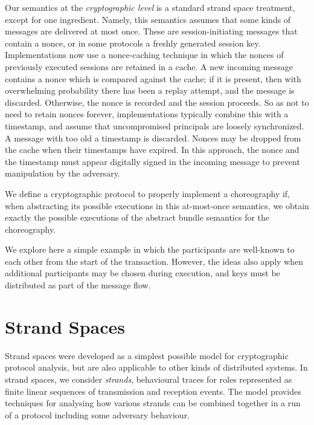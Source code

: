 \documentclass[copyright]{eptcs}
\begin{document}
Our semantics at the \emph{cryptographic level} is a standard strand
space treatment, except for one ingredient.  Namely, this semantics
assumes that some kinds of messages are delivered at most once.  These
are session-initiating messages that contain a nonce, or in some
protocols a freshly generated session key.  Implementations now use a
nonce-caching technique in which the nonces of previously executed
sessions are retained in a cache.  A new incoming message contains a
nonce which is compared against the cache; if it is present, then with
overwhelming probability there has been a replay attempt, and the
message is discarded.  Otherwise, the nonce is recorded and the
session proceeds.  So as not to need to retain nonces forever,
implementations typically combine this with a timestamp, and assume
that uncompromised principals are loosely synchronized.  A message
with too old a timestamp is discarded.  Nonces may be dropped from the
cache when their timestamps have expired.  In this approach, the nonce
and the timestamp must appear digitally signed in the incoming message
to prevent manipulation by the adversary.

We define a cryptographic protocol to properly implement a
choreography if, when abstracting its possible executions in this
at-most-once semantics, we obtain exactly the possible executions of
the abstract bundle semantics for the choreography.  

We explore here a simple example in which the participants are
well-known to each other from the start of the transaction.  However,
the ideas also apply when additional participants may be chosen during
execution, and keys must be distributed as part of the message flow.




\section{Strand Spaces}
\label{sec:strandspaces}


Strand spaces \cite{strandspaces,GuttmanEtAl05} were developed as a
simplest possible model for cryptographic protocol analysis, but are
also applicable to other kinds of distributed systems. In strand
spaces, we consider {\em strands}, behavioural traces for roles
represented as finite linear sequences of transmission and reception
events. The model provides techniques for analysing how various
strands can be combined together in a run of a protocol including some
adversary behaviour. 
\end{document}
